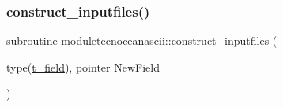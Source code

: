 \mbox{\label{namespacemoduletecnoceanascii_a974670f0506425b9522707dfc6ef649c}} 
\subsubsection{\texorpdfstring{construct\+\_\+inputfiles()}{construct\_inputfiles()}}
{\footnotesize\ttfamily subroutine moduletecnoceanascii\+::construct\+\_\+inputfiles (\begin{DoxyParamCaption}\item[{type(\mbox{\hyperlink{structmoduletecnoceanascii_1_1t__field}{t\+\_\+field}}), pointer}]{New\+Field }\end{DoxyParamCaption})\hspace{0.3cm}{\ttfamily [private]}}

